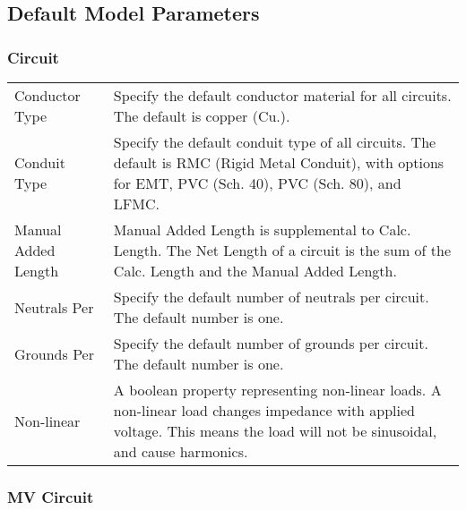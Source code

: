 \documentclass[letterpaper,10pt,english]{sphinxmanual}
\begin{document}
\subsection{Default Model Parameters}
\label{\detokenize{docs/definitions/index-definitions:default-model-parameters}}\label{\detokenize{docs/definitions/index-definitions:default-model-parameters-definitions}}

\subsubsection{Circuit}
\label{\detokenize{docs/definitions/index-definitions:circuit}}

\begin{savenotes}\sphinxattablestart
\centering
\begin{tabulary}{\linewidth}[t]{|T|T|}
\hline
\sphinxstyletheadfamily 
{}
&\sphinxstyletheadfamily 
{}
\\
\hline
Conductor Type
&
Specify the default conductor material for all circuits.  The default is copper (Cu.).
\\
\hline
Conduit Type
&
Specify the default conduit type of all circuits.  The default is RMC (Rigid Metal Conduit), with options for EMT, PVC (Sch. 40), PVC (Sch. 80), and LFMC.
\\
\hline
Manual Added Length
&
Manual Added Length is supplemental to Calc. Length.  The Net Length of a circuit is the sum of the Calc. Length and the Manual Added Length.
\\
\hline
Neutrals Per
&
Specify the default number of neutrals per circuit.  The default number is one.
\\
\hline
Grounds Per
&
Specify the default number of grounds per circuit.  The default number is one.
\\
\hline
Non-linear
&
A boolean property representing non-linear loads.  A non-linear load changes impedance with applied voltage.  This means the load will not be sinusoidal, and cause harmonics.
\\
\hline
\end{tabulary}
\par
\sphinxattableend\end{savenotes}


\subsubsection{MV Circuit}
\label{\detokenize{docs/definitions/index-definitions:mv-circuit}}
\end{document}
